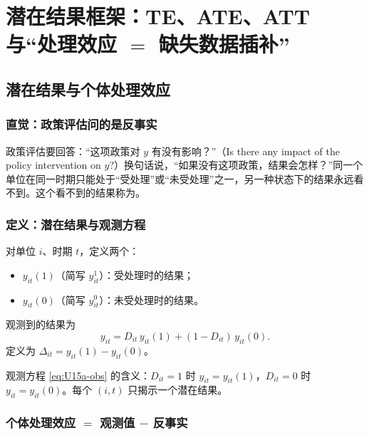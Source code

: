 \section{潜在结果框架：TE、ATE、ATT 与“处理效应 \texorpdfstring{$=$}{=} 缺失数据插补”}\label{sec:U15a-po}

\subsection{潜在结果与个体处理效应}

\subsubsection{直觉：政策评估问的是反事实}

政策评估要回答：“这项政策对 $y$ 有没有影响？”（Is there any impact of the policy intervention on $y$?）换句话说，“如果没有这项政策，结果会怎样？”同一个单位在同一时期只能处于“受处理”或“未受处理”之一，另一种状态下的结果永远看不到。这个看不到的结果称为。

\subsubsection{定义：潜在结果与观测方程}

\begin{defn}[潜在结果与个体处理效应]\label{def:U15a-po}
对单位 $i$、时期 $t$，定义两个：
\begin{itemize}
  \item $y_{it}(1)$（简写 $y^1_{it}$）：受处理时的结果；
  \item $y_{it}(0)$（简写 $y^0_{it}$）：未受处理时的结果。
\end{itemize}
观测到的结果为
\begin{equation}\label{eq:U15a-obs}
y_{it}=D_{it}\,y_{it}(1)+(1-D_{it})\,y_{it}(0).
\end{equation}
定义为 $\Delta_{it}=y_{it}(1)-y_{it}(0)$。
\end{defn}

观测方程 \eqref{eq:U15a-obs} 的含义：$D_{it}=1$ 时 $y_{it}=y_{it}(1)$，$D_{it}=0$ 时 $y_{it}=y_{it}(0)$。每个 $(i,t)$ 只揭示一个潜在结果。

\subsubsection{个体处理效应 \texorpdfstring{$=$}{=} 观测值 \texorpdfstring{$-$}{-} 反事实}

